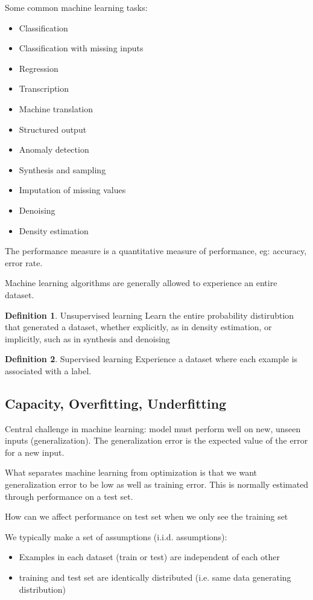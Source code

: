 \documentclass{article}
\theoremstyle{definition}
\newtheorem{definition}{Definition}[section]
\begin{document}
Some common machine learning tasks:
\begin{itemize}
    \item Classification
    \item Classification with missing inputs
    \item Regression
    \item Transcription
    \item Machine translation
    \item Structured output
    \item Anomaly detection
    \item Synthesis and sampling
    \item Imputation of missing values
    \item Denoising
    \item Density estimation
\end{itemize}

The performance measure is a quantitative measure of performance, eg: accuracy, error rate.

Machine learning algorithms are generally allowed to experience an entire dataset.
\begin{definition}
{Unsupervised learning} Learn the entire probability distirubtion that generated a dataset, whether explicitly, as in density estimation, or implicitly, such as in synthesis and denoising
\end{definition}

\begin{definition}
{Supervised learning} Experience a dataset where each example is associated with a label.
\end{definition}

\subsection{Capacity, Overfitting, Underfitting}

Central challenge in machine learning: model must perform well on new, unseen inputs (generalization). The generalization error is the expected value of the error for a new input.

What separates machine learning from optimization is that we want generalization error to be low as well as training error. This is normally estimated through performance on a test set.

How can we affect performance on test set when we only see the training set

We typically make a set of assumptions (i.i.d. assumptions):
\begin{itemize}
    \item Examples in each dataset (train or test) are independent of each other
    \item training and test set are identically distributed (i.e. same data generating distribution)
\end{itemize}
\end{document}
